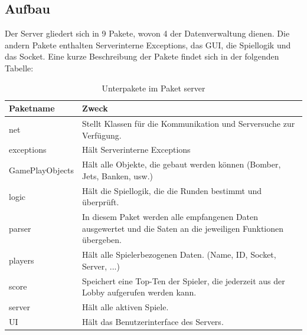 \documentclass[ngerman, 12pt, pdftex]{scrartcl}[2006/07/30]
\begin{document}
\subsection{Aufbau}
Der Server gliedert sich in 9 Pakete, wovon 4 der Datenverwaltung dienen. Die andern Pakete enthalten Serverinterne Exceptions, das GUI, die Spiellogik und das Socket.
Eine kurze Beschreibung der Pakete findet sich in der folgenden Tabelle:
\begin{table}[h!]
\begin{tabular}{ l p{11.5cm} }
  Paketname & Zweck \\ \hline
  
  net &  
  Stellt Klassen für die Kommunikation und Serversuche zur Verfügung. \\
  
  exceptions & 
  Hält Serverinterne Exceptions\\
  
  GamePlayObjects &
  Hält alle Objekte, die gebaut werden können (Bomber, Jets, Banken, usw.)\\
  
  logic &
  Hält die Spiellogik, die die Runden bestimmt und überprüft.\\
  
  parser &
  In diesem Paket werden alle empfangenen Daten ausgewertet und die Saten an die jeweiligen Funktionen übergeben.\\
  
  players &
  Hält alle Spielerbezogenen Daten. (Name, ID, Socket, Server, ...)\\
  
  score &
  Speichert eine Top-Ten der Spieler, die jederzeit aus der Lobby aufgerufen werden kann.\\
  
  server &
  Hält alle aktiven Spiele.\\
  
  UI &
  Hält das Benutzerinterface des Servers.\\
  
 
\end{tabular}
\caption{Unterpakete im Paket server}
\end{table}
\end{document}

